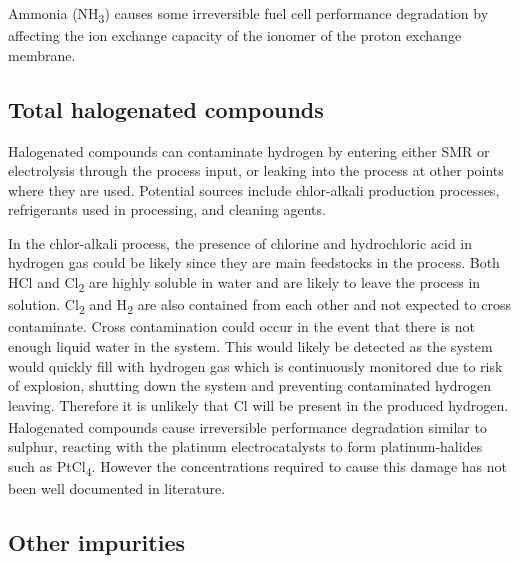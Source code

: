 Ammonia (NH\textsubscript{3}) causes some irreversible fuel cell performance degradation by affecting the ion exchange capacity of the ionomer of the proton exchange membrane. \cite{InternationalStandardISO14687-2:20122012}

\subsection*{Total halogenated compounds} 
Halogenated compounds can contaminate hydrogen by entering either SMR or electrolysis through the process input, or leaking into the process at other points where they are used. Potential sources include chlor-alkali production processes, refrigerants used in processing, and cleaning agents. \cite{Bacquart2018}

In the chlor-alkali process, the presence of chlorine and hydrochloric acid in hydrogen gas could be likely since they are main feedstocks in the process. Both HCl and Cl\textsubscript{2} are highly soluble in water and are likely to leave the process in solution. Cl\textsubscript{2} and H\textsubscript{2} are also contained from each other and not expected to cross contaminate. Cross contamination could occur in the event that there is not enough liquid water in the system. This would likely be detected as the system would quickly fill with hydrogen gas which is continuously monitored due to risk of explosion, shutting down the system and preventing contaminated hydrogen leaving. Therefore it is unlikely that Cl\textsubscript{ } will be present in the produced hydrogen. 
Halogenated compounds cause irreversible performance degradation similar to sulphur, reacting with the platinum electrocatalysts to form platinum-halides such as PtCl\textsubscript{4}. \cite{Dona2009} However the concentrations required to cause this damage has not been well documented in literature.

\subsection*{Other impurities}

